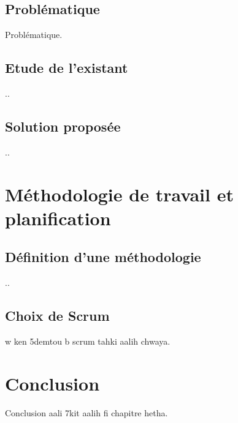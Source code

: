 \subsection{Problématique}

Problématique.\\

\subsection{Etude de l’existant}
..\\

\subsection{Solution proposée}
..\\

\section{Méthodologie de travail et planification}
\subsection{Définition d'une méthodologie}
..\\

\subsection{Choix de Scrum}
w ken 5demtou b scrum tahki aalih chwaya.\\






\section{Conclusion }
Conclusion aali 7kit aalih fi chapitre hetha.\\
